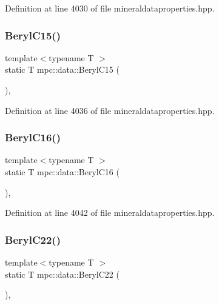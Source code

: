 Definition at line 4030 of file mineraldataproperties.\+hpp.

\mbox{\label{namespacempc_1_1data_a0e42d1d986c1c45e116e8062c86a023e}} 
\subsubsection{\texorpdfstring{Beryl\+C15()}{BerylC15()}}
{\footnotesize\ttfamily template$<$typename T $>$ \\
static T mpc\+::data\+::\+Beryl\+C15 (\begin{DoxyParamCaption}{ }\end{DoxyParamCaption})\hspace{0.3cm}{\ttfamily [inline]}, {\ttfamily [static]}}



Definition at line 4036 of file mineraldataproperties.\+hpp.

\mbox{\label{namespacempc_1_1data_a40354502fc40c775649cbae5a16a9f23}} 
\subsubsection{\texorpdfstring{Beryl\+C16()}{BerylC16()}}
{\footnotesize\ttfamily template$<$typename T $>$ \\
static T mpc\+::data\+::\+Beryl\+C16 (\begin{DoxyParamCaption}{ }\end{DoxyParamCaption})\hspace{0.3cm}{\ttfamily [inline]}, {\ttfamily [static]}}



Definition at line 4042 of file mineraldataproperties.\+hpp.

\mbox{\label{namespacempc_1_1data_aa81021345354ad32ddc0503d12d13d7f}} 
\subsubsection{\texorpdfstring{Beryl\+C22()}{BerylC22()}}
{\footnotesize\ttfamily template$<$typename T $>$ \\
static T mpc\+::data\+::\+Beryl\+C22 (\begin{DoxyParamCaption}{ }\end{DoxyParamCaption})\hspace{0.3cm}{\ttfamily [inline]}, {\ttfamily [static]}}



